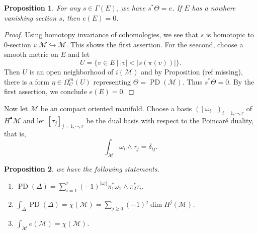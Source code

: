 \documentclass[10pt]{article}
\newtheorem{proposition}{Proposition}[section]
\DeclareMathOperator{\PD}{PD}
\newcommand{\M}[0]{\mathcal{M}}
\newcommand{\sep}[0]{\:|\:}
\begin{document}
\begin{proposition}
  For any $s\in\Gamma(E)$, we have $s^*\Theta=e$. If $E$ has a nowhere vanishing section $s$, then $e(E)=0$.
\end{proposition}
\begin{proof}
  Using homotopy invariance of cohomologies, we see that $s$ is homotopic to $0$-section $i:\M\hookrightarrow\M$. This shows the first assertion. For the seecond, choose a smooth metric on $E$ and let 
  \begin{equation*}
    U=\{v\in E\sep \vert v\vert<\vert s(\pi(v))\vert\}.
  \end{equation*} 
  Then $U$ is an open neighborhood of $i(\M)$ and by Proposition (ref missing), there is a form $\eta\in\Omega_C^m(U)$ representing $\Theta=\PD(\M)$. Thus $s^*\Theta=0$. By the first assertion, we conclude $e(E)=0$.
\end{proof}
Now let $\M$ be an compact oriented manifold. Choose a basis $([\omega_i])_{i=1,\cdots,r}$ of $H^\bullet\M$ and let $[\tau_j]_{j=1,\cdots,r}$ be the dual basis with respect to the Poincaré duality, that is,
\begin{equation*}
  \int_\M \omega_i\wedge\tau_j = \delta_{ij}.
\end{equation*}
\begin{proposition}
  we have the following statements.
  \begin{enumerate}[1).]
    \item $\PD(\Delta)=\sum_{i=1}^r(-1)^{\vert\omega_i\vert}\pi_1^*\omega_1\wedge\pi_2^*\tau_i$.
    \item $\int_\Delta\PD(\Delta) = \chi(\M) = \sum_{j\geq0}(-1)^j\dim H^j(\M)$.
    \item $\int_\M e(\M)=\chi(\M)$.
  \end{enumerate}
\end{proposition}
\end{document}

